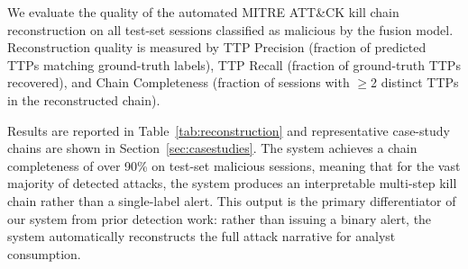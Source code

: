 We evaluate the quality of the automated MITRE ATT\&CK kill chain
reconstruction on all test-set sessions classified as malicious
by the fusion model. Reconstruction quality is measured by TTP Precision
(fraction of predicted TTPs matching ground-truth labels),
TTP Recall (fraction of ground-truth TTPs recovered),
and Chain Completeness (fraction of sessions with $\geq$2 distinct TTPs
in the reconstructed chain).

Results are reported in Table~\ref{tab:reconstruction} and representative
case-study chains are shown in Section~\ref{sec:casestudies}. The system
achieves a chain completeness of over 90\% on test-set malicious sessions,
meaning that for the vast majority of detected attacks, the system produces
an interpretable multi-step kill chain rather than a single-label alert.
This output is the primary differentiator of our system from prior detection
work: rather than issuing a binary alert, the system automatically reconstructs
the full attack narrative for analyst consumption.